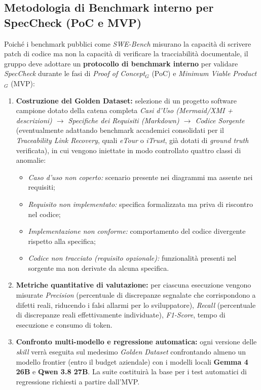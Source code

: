 \documentclass[a4paper, 11pt]{article}
\newcommand{\term}[1]{\textit{#1}$_G$} %
\begin{document}
\subsection{Metodologia di Benchmark interno per SpecCheck (PoC e MVP)}
Poiché i benchmark pubblici come \textit{SWE-Bench} misurano la capacità di scrivere patch di codice ma non la capacità di verificare la tracciabilità documentale, il gruppo deve adottare un \textbf{protocollo di benchmark interno} per validare \textit{SpecCheck} durante le fasi di \term{Proof of Concept} (PoC) e \term{Minimum Viable Product} (MVP):
\begin{enumerate}[noitemsep]
    \item \textbf{Costruzione del Golden Dataset:} selezione di un progetto software campione dotato della catena completa \textit{Casi d'Uso (Mermaid/XMI + descrizioni) $\rightarrow$ Specifiche dei Requisiti (Markdown) $\rightarrow$ Codice Sorgente} (eventualmente adattando benchmark accademici consolidati per il \textit{Traceability Link Recovery}, quali \textit{eTour} o \textit{iTrust}, già dotati di \textit{ground truth} verificata), in cui vengono iniettate in modo controllato quattro classi di anomalie:
    \begin{itemize}[noitemsep]
        \item \textit{Caso d'uso non coperto:} scenario presente nei diagrammi ma assente nei requisiti;
        \item \textit{Requisito non implementato:} specifica formalizzata ma priva di riscontro nel codice;
        \item \textit{Implementazione non conforme:} comportamento del codice divergente rispetto alla specifica;
        \item \textit{Codice non tracciato (requisito opzionale):} funzionalità presenti nel sorgente ma non derivate da alcuna specifica.
    \end{itemize}
    \item \textbf{Metriche quantitative di valutazione:} per ciascuna esecuzione vengono misurate \textit{Precision} (percentuale di discrepanze segnalate che corrispondono a difetti reali, riducendo i falsi allarmi per lo sviluppatore), \textit{Recall} (percentuale di discrepanze reali effettivamente individuate), \textit{F1-Score}, tempo di esecuzione e consumo di token.
    \item \textbf{Confronto multi-modello e regressione automatica:} ogni versione delle \textit{skill} verrà eseguita sul medesimo \textit{Golden Dataset} confrontando almeno un modello frontier (entro il budget aziendale) con i modelli locali \textbf{Gemma 4 26B} e \textbf{Qwen 3.8 27B}. La suite costituirà la base per i test automatici di regressione richiesti a partire dall'MVP.
\end{enumerate}
\end{document}
